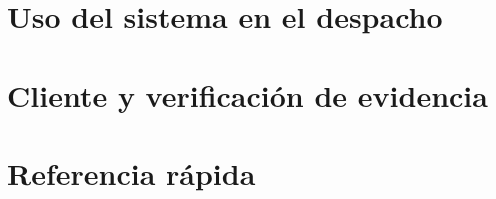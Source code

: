 \documentclass[12pt,letterpaper,oneside]{report}
\begin{document}


\setcounter{tocdepth}{1}
{\hypersetup{linkcolor=qadranavy}\tableofcontents}
\cleardoublepage
{}



\part{Uso del sistema en el despacho}\label{parte:despacho}












\part{Cliente y verificación de evidencia}\label{parte:cliente}




\part{Referencia rápida}\label{parte:referencia}

\end{document}
